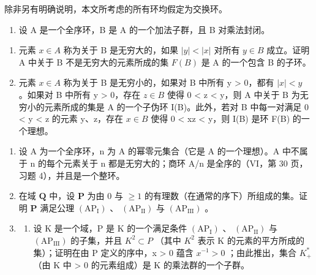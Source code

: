 \BourbakiExerciseGroup

除非另有明确说明，本文所考虑的所有环均假定为交换环。

\begin{enumerate}
\def\labelenumi{\arabic{enumi})}
\tightlist
\item
  设 A 是一个全序环，B 是 A 的一个加法子群，且 B 对乘法封闭。
\end{enumerate}

\begin{enumerate}
\def\labelenumi{\alph{enumi})}
\item
  元素 \(x \in A\) 称为关于 B 是无穷大的，如果 \(|y| < |x|\) 对所有 \(y \in B\) 成立。证明 A 中关于 B 不是无穷大的元素所成的集 \(F(B)\) 是 A 的一个包含 B 的子环。
\item
  元素 \(x \in A\) 称为关于 B 是无穷小的，如果对 B 中所有 y \textgreater{} 0，都有 \(|x| < y\) 。如果对 B 中所有 y \textgreater{} 0，存在 \(z \in B\) 使得 0 \textless{} z \textless{} y，则 A 中关于 B 为无穷小的元素所成的集是 A 的一个子伪环 I(B)。此外，若对 B 中每一对满足 0 \textless{} y \textless{} z 的元素 y、z，存在 \(x \in B\) 使得 0 \textless{} xz \textless{} y，则 I(B) 是环 F(B) 的一个理想。
\end{enumerate}

\begin{enumerate}
\def\labelenumi{\arabic{enumi})}
\setcounter{enumi}{1}
\item
  设 A 为一个全序环，n 为 A 的幂零元集合（它是 A 的一个理想）。A 中不属于 n 的每个元素关于 n 都是无穷大的；商环 A/n 是全序的（VI，第 30 页，习题 4），并且是一个整环。
\item
  在域 \(\mathbf{Q}\) 中，设 \(\mathbf{P}\) 为由 0 与 \(\geqslant 1\) 的有理数（在通常的序下）所组成的集。证明 \(\mathbf{P}\) 满足公理 \((\mathrm{AP}_{\mathrm{I}})\) 、 \((\mathrm{AP}_{\mathrm{II}})\) 与 \((\mathrm{AP}_{\mathrm{III}})\) 。
\item
  \begin{enumerate}
  \def\labelenumii{\alph{enumii})}
  \tightlist
  \item
    设 K 是一个域，P 是 K 的一个满足条件 \((\mathrm{AP}_{\mathrm{I}})\) 、 \((\mathrm{AP}_{\mathrm{II}})\) 与 \((\mathrm{AP}_{\mathrm{III}})\) 的子集，并且 \(K^{2} \subset P\) （其中 \(K^{2}\) 表示 K 的元素的平方所成的集）；证明在由 P 定义的序中，x \textgreater{} 0 蕴含 \(x^{-1} > 0\) ；由此推出，集合 \(K_{+}^{*}\) （由 K 中 \textgreater{} 0 的元素组成）是 K 的乘法群的一个子群。
  \end{enumerate}
\end{enumerate}

